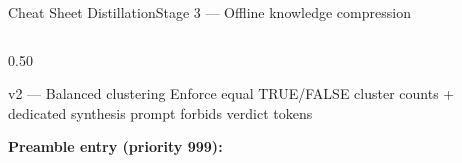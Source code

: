 \documentclass[aspectratio=169,10pt]{beamer}
\newcommand{\cy}[1]{\textcolor{AccentBlue}{\textbf{#1}}}
\begin{document}
\begin{frame}{Cheat Sheet Distillation}{Stage 3 — Offline knowledge compression}
\begin{columns}[T,onlytextwidth]
\begin{column}{0.50\textwidth}
    \vspace{4mm}

    \begin{exampleblock}{v2 — Balanced clustering}
      Enforce equal TRUE/FALSE cluster counts +
      dedicated synthesis prompt forbids verdict tokens
    \end{exampleblock}

    \vspace{4mm}
    \cy{Preamble entry (priority 999):}
    \vspace{2mm}

  \end{column}
\end{columns}
\end{frame}
\end{document}
